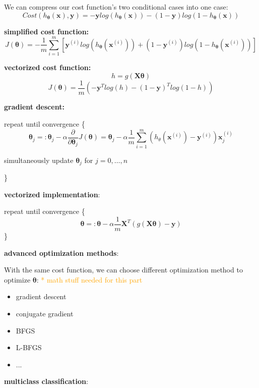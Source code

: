 \documentclass{article}
\begin{document}
\noindent We can compress our cost function's two conditional cases into one case:
\[Cost(h_{\boldsymbol{\theta}} (\textbf{x}), \textbf{y}) 
= - \textbf{y} log(h_{\boldsymbol{\theta}} (\textbf{x})) - (1 - \textbf{y}) log(1 - h_{\boldsymbol{\theta}} (\textbf{x}))\]

\noindent \textbf{simplified cost function:}
\[J(\boldsymbol{\theta}) = - \frac{1}{m} \sum_{i = 1}^{m} [\textbf{y}^{(i)} log(h_{\boldsymbol{\theta}} (\textbf{x}^{(i)})) + (1 - \textbf{y}^{(i)}) log(1 - h_{\boldsymbol{\theta}} (\textbf{x}^{(i)}))]\]

\noindent \textbf{vectorized cost function:}
\[h = g(\textbf{X}\boldsymbol{\theta})\]
\[J(\boldsymbol{\theta}) = \frac{1}{m} (- \textbf{y}^T log(h) - (1 - \textbf{y})^T log(1 - h))\]

\noindent \textbf{gradient descent:}

\noindent repeat until convergence \{
\[\boldsymbol{\theta}_j =: \boldsymbol{\theta}_j - \alpha \frac{\partial}{\partial \boldsymbol{\theta}_j} J(\boldsymbol{\theta}) = \boldsymbol{\theta}_j - \alpha \frac{1}{m} \sum_{i = 1}^m (h_{\theta}(\textbf{x}^{(i)}) - \textbf{y}^{(i)}) \textbf{x}^{(i)}_j\]
\centerline{simultaneously update \(\boldsymbol{\theta}_j\) for \(j = 0, \dots, n\)}
\}

\bigskip

\noindent \textbf{vectorized implementation}:

\noindent repeat until convergence \{
\[\boldsymbol{\theta} =: \boldsymbol{\theta} - \alpha \frac{1}{m} \textbf{X}^T (g(\textbf{X}\boldsymbol{\theta}) - \textbf{y})\]
\}

\bigskip

\noindent \textbf{advanced optimization methods}:

\noindent With the same cost function, we can choose different optimization method to optimize \(\boldsymbol{\theta}\): \textcolor{orange}{ * math stuff needed for this part}

\begin{itemize}
\item gradient descent
\item conjugate gradient
\item BFGS
\item L-BFGS
\item ...
\end{itemize}

\bigskip

\noindent \textbf{multiclass classification}:
\end{document}
